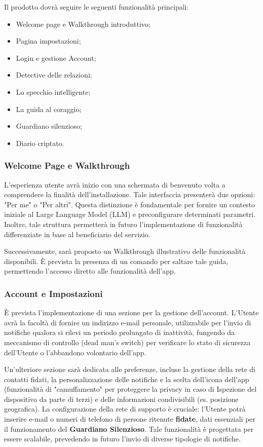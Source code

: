 \documentclass[a4paper,12pt]{article}
\newcommand{\ignoreglossary}{}
\begin{document}
Il prodotto dovrà seguire le seguenti funzionalità principali:

\begin{itemize}
    \item Welcome page e Walkthrough introduttivo;
    \item Pagina impostazioni;
    \item Login e gestione Account;
    \item Detective delle relazioni;
    \item Lo specchio intelligente;
    \item La guida al coraggio;
    \item Guardiano silenzioso;
    \item Diario criptato.
\end{itemize}

\subsubsection{Welcome Page e \ignoreglossary{Walkthrough}}
L'esperienza \ignoreglossary{utente} avrà inizio con una schermata di benvenuto volta a comprendere la finalità dell'installazione. Tale interfaccia presenterà due opzioni: "Per me" o "Per altri". Questa distinzione è fondamentale per fornire un contesto iniziale al Large Language Model (LLM) e preconfigurare determinati parametri. Inoltre, tale struttura permetterà in futuro l'implementazione di funzionalità differenziate in base al beneficiario del servizio.

Successivamente, sarà proposto un Walkthrough illustrativo delle funzionalità disponibili. È prevista la presenza di un comando per saltare tale guida, permettendo l'accesso diretto alle funzionalità dell'app.

\subsubsection{Account e Impostazioni}
È prevista l'implementazione di una sezione per la gestione dell'account. L'Utente avrà la facoltà di fornire un indirizzo e-mail personale, utilizzabile per l'invio di notifiche qualora si rilevi un periodo prolungato di inattività, fungendo da meccanismo di controllo (dead man's switch) per verificare lo stato di sicurezza dell'Utente o l'abbandono volontario dell'app.

Un'ulteriore sezione sarà dedicata alle preferenze, incluse la gestione della rete di contatti fidati, la personalizzazione delle notifiche e la scelta dell'icona dell'app (funzionalità di "camuffamento" per proteggere la privacy in caso di Ispezione del dispositivo da parte di terzi) e delle informazioni condivisibili (es. posizione geografica). La configurazione della rete di supporto è cruciale: l'Utente potrà inserire e-mail o numeri di telefono di persone ritenute \textbf{fidate}, dati essenziali per il funzionamento del \textbf{Guardiano Silenzioso}. Tale funzionalità è progettata per essere scalabile, prevedendo in futuro l'invio di diverse tipologie di notifiche.
\end{document}
